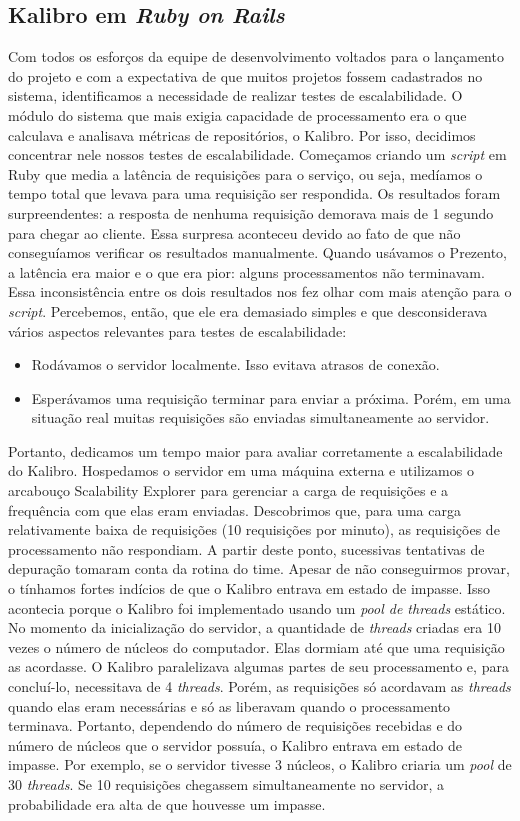 \documentclass{llncs}
\begin{document}
  \subsection{Kalibro em \textit{Ruby on Rails}}
  Com todos os esforços da equipe de desenvolvimento voltados para o lançamento do projeto e com a expectativa de que muitos projetos fossem cadastrados no sistema, identificamos a necessidade de realizar testes de escalabilidade. O módulo do sistema que mais exigia capacidade de processamento era o que calculava e analisava métricas de repositórios, o Kalibro. Por isso, decidimos concentrar nele nossos testes de escalabilidade.
  Começamos criando um \textit{script} em Ruby que media a latência de requisições para o serviço, ou seja, medíamos o tempo total que levava para uma requisição ser respondida. Os resultados foram surpreendentes: a resposta de nenhuma requisição demorava mais de 1 segundo para chegar ao cliente. Essa surpresa aconteceu devido ao fato de que não conseguíamos verificar os resultados manualmente. Quando usávamos o Prezento, a latência era maior e o que era pior: alguns processamentos não terminavam. Essa inconsistência entre os dois resultados nos fez olhar com mais atenção para o \textit{script}. Percebemos, então, que ele era demasiado simples e que desconsiderava vários aspectos relevantes para testes de escalabilidade:
  \begin{itemize}
    \item Rodávamos o servidor localmente. Isso evitava atrasos de conexão.
    \item Esperávamos uma requisição terminar para enviar a próxima. Porém, em uma situação real muitas requisições são enviadas simultaneamente ao servidor.
  \end{itemize}
  Portanto, dedicamos um tempo maior para avaliar corretamente a escalabilidade do Kalibro. Hospedamos o servidor em uma máquina externa e utilizamos o arcabouço Scalability Explorer para gerenciar a carga de requisições e a frequência com que elas eram enviadas. Descobrimos que, para uma carga relativamente baixa de requisições (10 requisições por minuto), as requisições de processamento não respondiam. A partir deste ponto, sucessivas tentativas de depuração tomaram conta da rotina do time. Apesar de não conseguirmos provar, o tínhamos fortes indícios de que o Kalibro entrava em estado de impasse. Isso acontecia porque o Kalibro foi implementado usando um \textit{pool de threads} estático. No momento da inicialização do servidor, a quantidade de \textit{threads} criadas era 10 vezes o número de núcleos do computador. Elas dormiam até que uma requisição as acordasse. O Kalibro paralelizava algumas partes de seu processamento e, para concluí-lo, necessitava de 4 \textit{threads}. Porém, as requisições só acordavam as \textit{threads} quando elas eram necessárias e só as liberavam quando o processamento terminava. Portanto, dependendo do número de requisições recebidas e do número de núcleos que o servidor possuía, o Kalibro entrava em estado de impasse. Por exemplo, se o servidor tivesse 3 núcleos, o Kalibro criaria um \textit{pool} de 30 \textit{threads}. Se 10 requisições chegassem simultaneamente no servidor, a probabilidade era alta de que houvesse um impasse.
\end{document}
